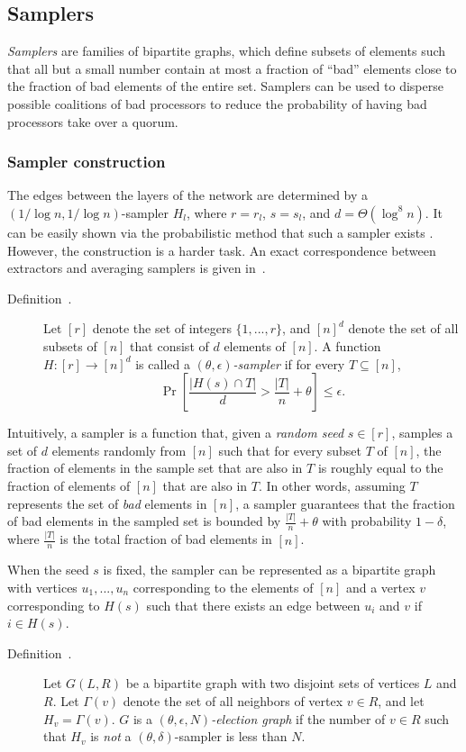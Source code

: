 \documentclass[11pt]{article}
\theoremstyle{plain}
\begin{document}
\subsection{Samplers}

\emph{Samplers} are families of bipartite graphs, which define subsets
of elements such that all but a small number contain at most a fraction
of ``bad'' elements close to the fraction of bad elements of the
entire set. Samplers can be used to disperse possible coalitions of
bad processors to reduce the probability of having bad processors
take over a quorum.%

\subsubsection{Sampler construction}

The edges between the layers of the network are determined by a $(1/\log{n},1/\log{n})$-sampler $H_{l}$, where
$r=r_{l}$, $s=s_{l}$, and $d=\Theta(\log^{8}{n})$. It can be easily
shown via the probabilistic method that such a sampler exists \cite{king:2006:leader}.
However, the construction is a harder task. An exact correspondence
between extractors and averaging samplers is given in~\cite{zuckerman-sampling}.

\begin{description}
	\item [{Definition~\cite{Gradwohl}.}] Let $[r]$ denote the set of integers
	$\{1,...,r\}$, and $[n]^{d}$ denote the set of all subsets of $[n]$
	that consist of $d$ elements of $[n]$. A function $H:[r]\to[n]^{d}$
	is called a \emph{$(\theta,\epsilon)$-sampler} if for every $T\subseteq[n]$,
	\[
	\Pr\left[\frac{|H(s)\cap T|}{d}>\frac{|T|}{n}+\theta\right]\leq\epsilon.
	\]
\end{description}
Intuitively, a sampler is a function that, given a \emph{random seed}
$s\in[r]$, samples a set of $d$ elements randomly from $[n]$ such
that for every subset $T$ of $[n]$, the fraction of elements in
the sample set that are also in $T$ is roughly equal to the fraction
of elements of $[n]$ that are also in $T$. In other words, assuming
$T$ represents the set of \emph{bad} elements in $[n]$, a sampler
guarantees that the fraction of bad elements in the sampled set is
bounded by $\frac{|T|}{n}+\theta$ with probability $1-\delta$, where
$\frac{|T|}{n}$ is the total fraction of bad elements in $[n]$.

When the seed $s$ is fixed, the sampler can be represented as a bipartite
graph with vertices $u_{1},...,u_{n}$ corresponding to the elements
of $[n]$ and a vertex $v$ corresponding to $H(s)$ such that there
exists an edge between $u_{i}$ and $v$ if $i\in H(s)$.
\begin{description}
	\item [{Definition~\cite{king:2006:p2p}.}] Let $G(L,R)$
	be a bipartite graph with two disjoint sets of vertices $L$ and $R$.
	Let $\Gamma(v)$ denote the set of all neighbors of vertex $v\in R$,
	and let $H_{v}=\Gamma(v)$. $G$ is a \emph{$(\theta,\epsilon,N)$-election
		graph} if the number of $v\in R$ such that $H_{v}$ is \emph{not}
	a $(\theta,\delta)$-sampler is less than $N$.
\end{description}
\end{document}
